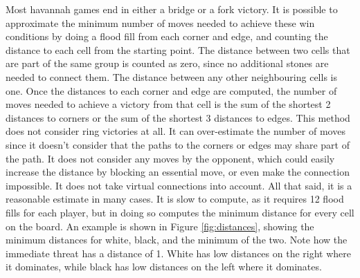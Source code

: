 Most havannah games end in either a bridge or a fork victory. It is possible to approximate the minimum number of moves needed to achieve these win conditions by doing a flood fill from each corner and edge, and counting the distance to each cell from the starting point. The distance between two cells that are part of the same group is counted as zero, since no additional stones are needed to connect them. The distance between any other neighbouring cells is one. Once the distances to each corner and edge are computed, the number of moves needed to achieve a victory from that cell is the sum of the shortest 2 distances to corners or the sum of the shortest 3 distances to edges. This method does not consider ring victories at all. It can over-estimate the number of moves since it doesn't consider that the paths to the corners or edges may share part of the path. It does not consider any moves by the opponent, which could easily increase the distance by blocking an essential move, or even make the connection impossible. It does not take virtual connections into account. All that said, it is a reasonable estimate in many cases. It is slow to compute, as it requires 12 flood fills for each player, but in doing so computes the minimum distance for every cell on the board. An example is shown in Figure \ref{fig:distances}, showing the minimum distances for white, black, and the minimum of the two. Note how the immediate threat has a distance of 1. White has low distances on the right where it dominates, while black has low distances on the left where it dominates.

